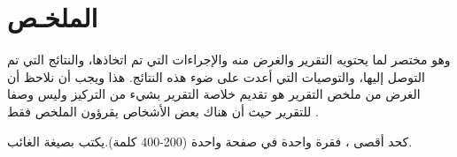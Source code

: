 \cleardoublepage
\newpage


	\renewcommand{\chaptername}{MyChapter}

\chapter*{\textarabic{ الملخـص}}
\begin{Arabic}
	\begingroup
\fontsize{14pt}{15pt} \selectfont

وهو مختصر لما يحتويه التقرير والغرض منه والإجراءات التي تم اتخاذها، والنتائج التي تم التوصل إليها، والتوصيات التي أعدت على ضوء هذه النتائج. هذا ويجب أن نلاحظ أن الغرض من ملخص التقرير هو \space تقديم خلاصة التقرير بشيء من التركيز وليس وصفا للتقرير حيث أن هناك بعض الأشخاص يقرؤون الملخص فقط .
	
	
\noindent	كحد أقصى ، فقرة واحدة في صفحة واحدة (200-400 كلمة).يكتب بصيغة الغائب.
	
\endgroup
\end{Arabic}